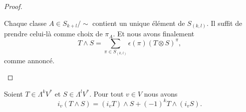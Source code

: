 \begin{proof}
\begin{subproof}
		\spitem[Conclusion]
		Chaque classe \( A\in S_{k+l}/\sim\) contient un unique élément de \( S_{(k,l)}\). Il suffit de prendre celui-là comme choix de \( \pi_A\). Et nous avons finalement
		\begin{equation}
			T\wedge S=\sum_{\pi\in S_{(k,l)}}\epsilon(\pi)(T\otimes S)^{\pi},
		\end{equation}
		comme annoncé.
	\end{subproof}
\end{proof}


\begin{proposition}		\label{PROPooYCRXooSOsqCb}
	Soient \( T\in \Lambda^kV^*\) et \( S\in \Lambda^lV^*\). Pour tout \( v\in V\) nous avons
	\begin{equation}		\label{EQooGMHPooBjTtly}
		i_v(T\wedge S)=(i_vT)\wedge S+(-1)^kT\wedge(i_vS).
	\end{equation}
\end{proposition}

